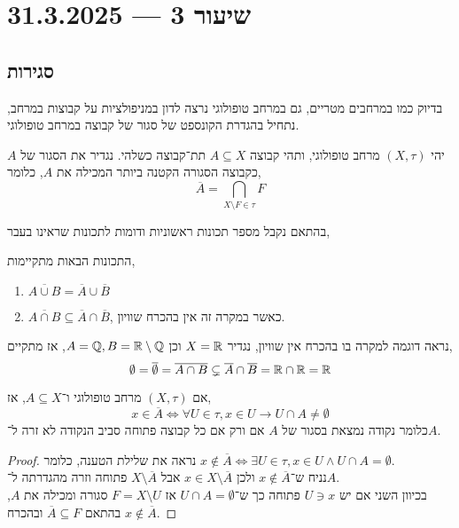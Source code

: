 \section{שיעור 3 --- 31.3.2025}
\subsection{סגירות}
בדיוק כמו במרחבים מטריים, גם במרחב טופולוגי נרצה לדון במניפולציות על קבוצות במרחב, נתחיל בהגדרת הקונספט של סגור של קבוצה במרחב טופולוגי.
\begin{definition}
	יהי $(X, \tau)$ מרחב טופולוגי, ותהי קבוצה $A \subseteq X$ תת־קבוצה כשלהי.
	נגדיר את הסגור של $A$ כקבוצה הסגורה הקטנה ביותר המכילה את $A$, כלומר,
	\[
		\overline{A}
		= \bigcap_{X \setminus F \in \tau} F
	\]
\end{definition}
בהתאם נקבל מספר תכונות ראשוניות ודומות לתכונות שראינו בעבר,
\begin{lemma}
	התכונות הבאות מתקיימות,
	\begin{enumerate}
		\item $\overline{A \cup B} = \overline{A} \cup \overline{B}$
		\item $\overline{A \cap B} \subseteq \overline{A} \cap \overline{B}$, כאשר במקרה זה אין בהכרח שוויון.
	\end{enumerate}
\end{lemma}
\begin{example}
	נראה דוגמה למקרה בו בהכרח אין שוויון,
	נגדיר $X = \mathbb{R}$ וכן $A = \mathbb{Q}, B = \mathbb{R} \setminus \mathbb{Q}$, אז מתקיים,
	\[
		\emptyset
		= \overline{\emptyset}
		= \overline{A \cap B}
		\subsetneq \overline{A} \cap \overline{B}
		= \mathbb{R} \cap \mathbb{R}
		= \mathbb{R}
	\]
\end{example}
\begin{proposition}
	אם $(X, \tau)$ מרחב טופולוגי ו־$A \subseteq X$, אז,
	\[
		x \in \overline{A}
		\iff \forall U \in \tau, x \in U \rightarrow U \cap A \ne \emptyset
	\]
	כלומר נקודה נמצאת בסגור של $A$ אם ורק אם כל קבוצה פתוחה סביב הנקודה לא זרה ל־$A$.
\end{proposition}
\begin{proof}
	נראה את שלילת הטענה, כלומר $x \notin \overline{A} \iff \exists U \in \tau, x \in U \land U \cap A = \emptyset$. \\
	נניח ש־$x \notin \overline{A}$ ולכן $x \in X \setminus \overline{A}$ אבל $X \setminus \overline{A}$ פתוחה וזרה מהגדרתה ל־$A$. \\
	בכיוון השני אם יש $U \ni x$ פתוחה כך ש־$U \cap A = \emptyset$ אז $F = X \setminus U$ סגורה ומכילה את $A$, בהתאם $\overline{A} \subseteq F$ ובהכרח $x \notin \overline{A}$.
\end{proof}
